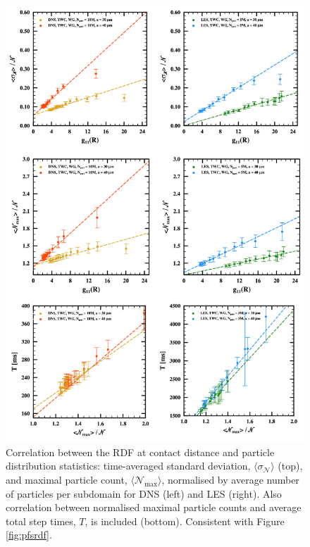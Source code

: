 \begin{figure}
\centering
\includegraphics[width=13.5cm]{figures/3-15_pfprdf.pdf}
\caption{
Correlation between the RDF at contact distance and particle distribution statistics: time-averaged standard deviation, $\langle \sigma_{\mathcal{N}} \rangle$ (top), and maximal particle count, $\langle \mathcal{N}_{\max} \rangle$, normalised by average number of particles per subdomain for DNS (left) and LES (right).
Also correlation between normalised maximal particle counts and average total step times, $T$, is included (bottom).
Consistent with Figure \ref{fig:pfsrdf}.
}
\label{fig:pfprdf}
\end{figure}


